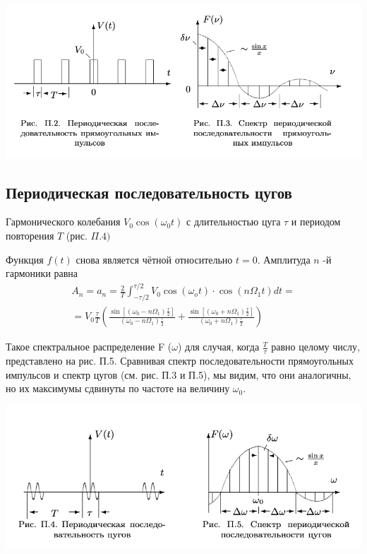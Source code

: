 \documentclass[a4paper, 12pt]{article}%
\begin{document}
 \begin{center}
\includegraphics[width=0.7\linewidth]{./anat/2.jpg}\\
\end{center}

\subsection{Периодическая последовательность цугов}
Гармонического колебания $V_{0} \cos \left(\omega_{0} t\right)$ с длительностью цуга $\tau$ и периодом повторения $T$ (рис. $\Pi .4)$
 
Функция $f(t)$ снова является чётной относительно $t=0 .$ Амплитуда $n$ -й гармоники равна
$$
\begin{array}{c}
A_{n}=a_{n}=\frac{2}{T} \int_{-\tau / 2}^{\tau / 2} V_{0} \cos \left(\omega_{o} t\right) \cdot \cos \left(n \Omega_{1} t\right) d t= \\
=V_{0} \frac{\tau}{T}\left(\frac{\sin \left[\left(\omega_{0}-n \Omega_{1}\right) \frac{\tau}{2}\right]}{\left(\omega_{0}-n \Omega_{1}\right) \frac{\tau}{2}}+\frac{\sin \left[\left(\omega_{0}+n \Omega_{1}\right) \frac{\tau}{2}\right]}{\left(\omega_{0}+n \Omega_{1}\right) \frac{\tau}{2}}\right)
\end{array}
$$

Такое спектральное распределение F ($\omega$) для случая, когда $\frac T\tau$ равно целому числу, представлено на рис. П.5. Сравнивая спектр последовательности прямоугольных импульсов и спектр цугов (см. рис. П.3 и П.5), мы видим, что они аналогичны, но их максимумы сдвинуты по частоте на величину $\omega_0$.

\begin{center}
\includegraphics[width=0.7\linewidth]{./anat/3.jpg}\\
\end{center}
\end{document}
